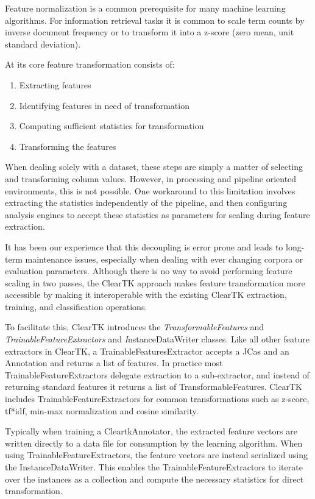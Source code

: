 \documentclass[10pt, a4paper]{article}
\begin{document}
Feature normalization is a common prerequisite for many machine learning algorithms.  For information retrieval tasks it is common to scale term counts by inverse document frequency or to transform it into a z-score (zero mean, unit standard deviation).

At its core feature transformation consists of:
\begin{enumerate}
\item Extracting features
\item Identifying features in need of transformation
\item Computing sufficient statistics for transformation
\item Transforming the features
\end{enumerate}

When dealing solely with a dataset, these steps are simply a matter of selecting and transforming column values.  However, in processing and pipeline oriented environments, this is not possible.  One workaround to this limitation involves extracting the statistics independently of the pipeline, and then configuring analysis engines to accept these statistics as parameters for scaling during feature extraction.

It has been our experience that this decoupling is error prone and leads to long-term maintenance issues, especially when dealing with ever changing corpora or evaluation parameters.  Although there is no way to avoid performing feature scaling in two passes, the ClearTK approach makes feature transformation more accessible by making it interoperable with the existing ClearTK extraction, training, and classification operations.

To facilitate this, ClearTK introduces the \emph{TransformableFeatures} and \emph{TrainableFeatureExtractors} and {\emph InstanceDataWriter} classes.  Like all other feature extractors in ClearTK, a TrainableFeaturesExtractor accepts a JCas and an Annotation and returns a list of features.  In practice most TrainableFeatureExtractors delegate extraction to a sub-extractor, and instead of returning standard features it returns a list of TransformableFeatures.  ClearTK includes TrainableFeatureExtractors for common transformations such as z-score, tf*idf, min-max normalization and cosine similarity.

Typically when training a CleartkAnnotator, the extracted feature vectors are written directly to a data file for consumption by the learning algorithm.  When using TrainableFeatureExtractors, the feature vectors are instead serialized using the InstanceDataWriter.  This enables the TrainableFeatureExtractors to iterate over the instances as a collection and compute the necessary statistics for direct transformation.
\end{document}
